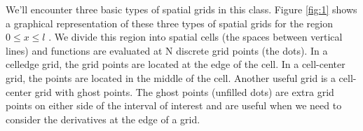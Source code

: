     We\rq ll encounter three basic types of spatial grids in this class. Figure \ref{fig:1} shows a graphical representation of these three types of spatial grids for the region 
    \begin{math}0\leqslant x \leqslant l \end{math} . We divide this region into spatial cells (the spaces between vertical lines) and functions are evaluated at N discrete grid points (the dots). In a celledge grid, the grid points are located at the edge of the cell. In a cell-center grid, the points are located in the middle of the cell. Another useful grid is a cell-center grid with ghost points. The ghost points (unfilled dots) are extra grid points on either side of the interval of interest and are useful when we need to consider the derivatives at the edge of a grid.

